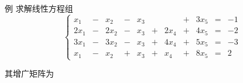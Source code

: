 \begin{frame}
  \begin{overprint}
    \begin{exampleblock}{例}
      求解线性方程组
      $$
      \left\{
      \begin{array}{rcrcrcrcrcrr}
         x_1 & - &  x_2 & - &  x_3 &   &       & + & 3x_5 & = &-1 \\[0.1cm]
        2x_1 & - & 2x_2 & - &  x_3 & + &  2x_4 & + & 4x_5 & = &-2 \\[0.1cm]
        3x_1 & - & 3x_2 & - &  x_3 & + &  4x_4 & + & 5x_5 & = &-3 \\[0.1cm]
         x_1 & - &  x_2 & + &  x_3 & + &   x_4 & + & 8x_5 & = & 2 
      \end{array}
      \right.
      $$
    \end{exampleblock}    
  \end{overprint}
  \pause 
  \begin{overprint}
    其增广矩阵为
    \begin{figure}
      \centering
      
      
    \end{figure}

  \end{overprint}
  \end{frame}



